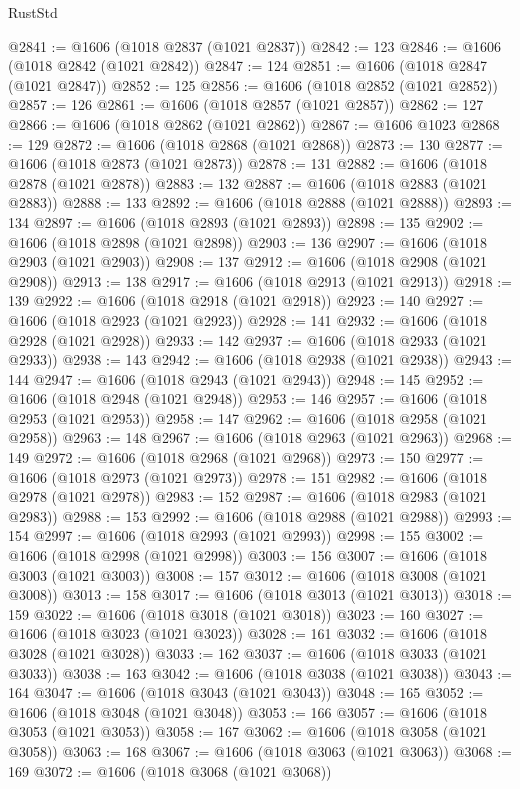 \begin{lexlean}{RustStd}
\begin{coremodule}
@2841 := @1606 (@1018 @2837 (@1021 @2837))
@2842 := 123
@2846 := @1606 (@1018 @2842 (@1021 @2842))
@2847 := 124
@2851 := @1606 (@1018 @2847 (@1021 @2847))
@2852 := 125
@2856 := @1606 (@1018 @2852 (@1021 @2852))
@2857 := 126
@2861 := @1606 (@1018 @2857 (@1021 @2857))
@2862 := 127
@2866 := @1606 (@1018 @2862 (@1021 @2862))
@2867 := @1606 @1023
@2868 := 129
@2872 := @1606 (@1018 @2868 (@1021 @2868))
@2873 := 130
@2877 := @1606 (@1018 @2873 (@1021 @2873))
@2878 := 131
@2882 := @1606 (@1018 @2878 (@1021 @2878))
@2883 := 132
@2887 := @1606 (@1018 @2883 (@1021 @2883))
@2888 := 133
@2892 := @1606 (@1018 @2888 (@1021 @2888))
@2893 := 134
@2897 := @1606 (@1018 @2893 (@1021 @2893))
@2898 := 135
@2902 := @1606 (@1018 @2898 (@1021 @2898))
@2903 := 136
@2907 := @1606 (@1018 @2903 (@1021 @2903))
@2908 := 137
@2912 := @1606 (@1018 @2908 (@1021 @2908))
@2913 := 138
@2917 := @1606 (@1018 @2913 (@1021 @2913))
@2918 := 139
@2922 := @1606 (@1018 @2918 (@1021 @2918))
@2923 := 140
@2927 := @1606 (@1018 @2923 (@1021 @2923))
@2928 := 141
@2932 := @1606 (@1018 @2928 (@1021 @2928))
@2933 := 142
@2937 := @1606 (@1018 @2933 (@1021 @2933))
@2938 := 143
@2942 := @1606 (@1018 @2938 (@1021 @2938))
@2943 := 144
@2947 := @1606 (@1018 @2943 (@1021 @2943))
@2948 := 145
@2952 := @1606 (@1018 @2948 (@1021 @2948))
@2953 := 146
@2957 := @1606 (@1018 @2953 (@1021 @2953))
@2958 := 147
@2962 := @1606 (@1018 @2958 (@1021 @2958))
@2963 := 148
@2967 := @1606 (@1018 @2963 (@1021 @2963))
@2968 := 149
@2972 := @1606 (@1018 @2968 (@1021 @2968))
@2973 := 150
@2977 := @1606 (@1018 @2973 (@1021 @2973))
@2978 := 151
@2982 := @1606 (@1018 @2978 (@1021 @2978))
@2983 := 152
@2987 := @1606 (@1018 @2983 (@1021 @2983))
@2988 := 153
@2992 := @1606 (@1018 @2988 (@1021 @2988))
@2993 := 154
@2997 := @1606 (@1018 @2993 (@1021 @2993))
@2998 := 155
@3002 := @1606 (@1018 @2998 (@1021 @2998))
@3003 := 156
@3007 := @1606 (@1018 @3003 (@1021 @3003))
@3008 := 157
@3012 := @1606 (@1018 @3008 (@1021 @3008))
@3013 := 158
@3017 := @1606 (@1018 @3013 (@1021 @3013))
@3018 := 159
@3022 := @1606 (@1018 @3018 (@1021 @3018))
@3023 := 160
@3027 := @1606 (@1018 @3023 (@1021 @3023))
@3028 := 161
@3032 := @1606 (@1018 @3028 (@1021 @3028))
@3033 := 162
@3037 := @1606 (@1018 @3033 (@1021 @3033))
@3038 := 163
@3042 := @1606 (@1018 @3038 (@1021 @3038))
@3043 := 164
@3047 := @1606 (@1018 @3043 (@1021 @3043))
@3048 := 165
@3052 := @1606 (@1018 @3048 (@1021 @3048))
@3053 := 166
@3057 := @1606 (@1018 @3053 (@1021 @3053))
@3058 := 167
@3062 := @1606 (@1018 @3058 (@1021 @3058))
@3063 := 168
@3067 := @1606 (@1018 @3063 (@1021 @3063))
@3068 := 169
@3072 := @1606 (@1018 @3068 (@1021 @3068))

\end{coremodule}
\end{lexlean}
